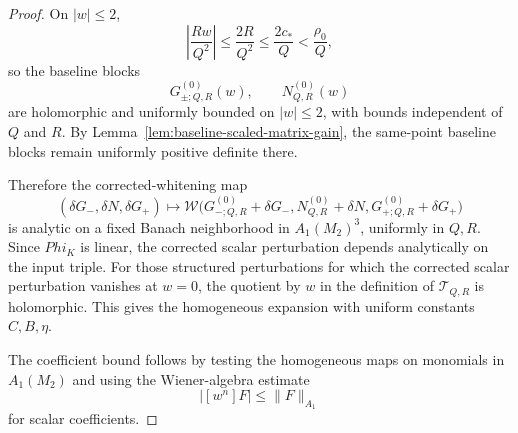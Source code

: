 \documentclass[11pt,a4paper]{amsart}
\def\Phi{Phi}%
\theoremstyle{plain}
\theoremstyle{definition}
\begin{document}
\begin{proof}
On $|w|\le 2$,
\[
\left|\frac{Rw}{Q^2}\right|
\le \frac{2R}{Q^2}
\le \frac{2c_*}{Q}
<\frac{\rho_0}{Q},
\]
so the baseline blocks
\[
G^{(0)}_{\pm;Q,R}(w),\qquad N^{(0)}_{Q,R}(w)
\]
are holomorphic and uniformly bounded on $|w|\le 2$, with bounds
independent of $Q$ and $R$. By
Lemma~\ref{lem:baseline-scaled-matrix-gain}, the same-point baseline blocks
remain uniformly positive definite there.

Therefore the corrected-whitening map
\[
(\delta G_-,\delta N,\delta G_+)
\longmapsto
\mathcal W\bigl(
G^{(0)}_{-;Q,R}+\delta G_-,
N^{(0)}_{Q,R}+\delta N,
G^{(0)}_{+;Q,R}+\delta G_+
\bigr)
\]
is analytic on a fixed Banach neighborhood in $A_1(M_2)^3$, uniformly in
$Q,R$. Since $\Phi_K$ is linear, the corrected scalar perturbation depends
analytically on the input triple. For those structured perturbations for which
the corrected scalar perturbation vanishes at $w=0$, the quotient by $w$ in
the definition of $\mathcal T_{Q,R}$ is holomorphic. This gives the
homogeneous expansion with uniform constants $C,B,\eta$.

The coefficient bound follows by testing the homogeneous maps on monomials in
$A_1(M_2)$ and using the Wiener-algebra estimate
\[
|[w^n]F|\le \|F\|_{A_1}
\]
for scalar coefficients.
\end{proof}
\end{document}
